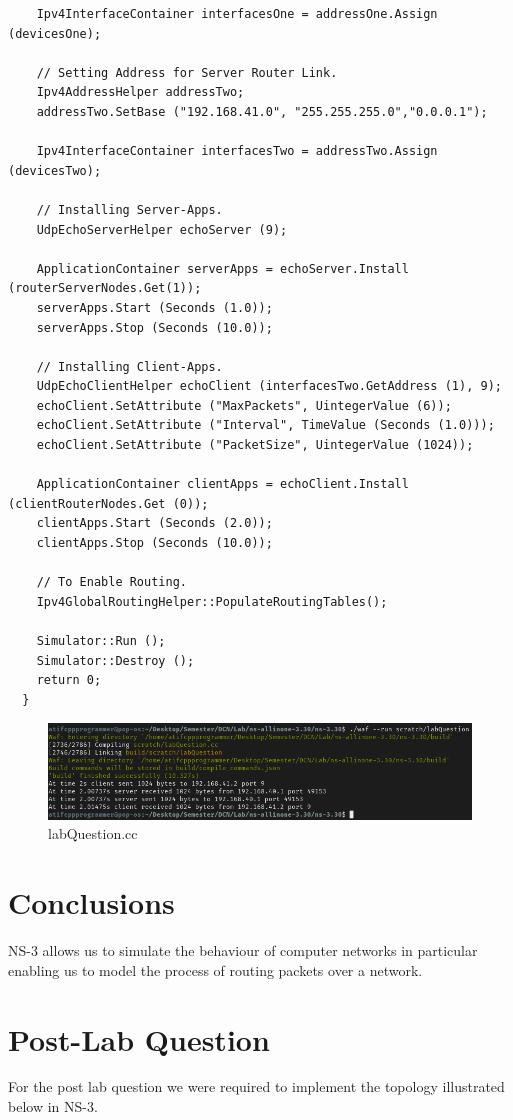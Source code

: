 \documentclass[fullpage]{article}
\begin{document}
\begin{verbatim}
    Ipv4InterfaceContainer interfacesOne = addressOne.Assign (devicesOne);

    // Setting Address for Server Router Link.
    Ipv4AddressHelper addressTwo;
    addressTwo.SetBase ("192.168.41.0", "255.255.255.0","0.0.0.1");

    Ipv4InterfaceContainer interfacesTwo = addressTwo.Assign (devicesTwo);

    // Installing Server-Apps.
    UdpEchoServerHelper echoServer (9);

    ApplicationContainer serverApps = echoServer.Install (routerServerNodes.Get(1));
    serverApps.Start (Seconds (1.0));
    serverApps.Stop (Seconds (10.0));

    // Installing Client-Apps.
    UdpEchoClientHelper echoClient (interfacesTwo.GetAddress (1), 9);
    echoClient.SetAttribute ("MaxPackets", UintegerValue (6));
    echoClient.SetAttribute ("Interval", TimeValue (Seconds (1.0)));
    echoClient.SetAttribute ("PacketSize", UintegerValue (1024));

    ApplicationContainer clientApps = echoClient.Install (clientRouterNodes.Get (0));
    clientApps.Start (Seconds (2.0));
    clientApps.Stop (Seconds (10.0));

    // To Enable Routing.
    Ipv4GlobalRoutingHelper::PopulateRoutingTables();

    Simulator::Run ();
    Simulator::Destroy ();
    return 0;
  }
\end{verbatim}

\begin{figure}[H]
  \includegraphics[width=\linewidth]{labQuestion.png}
  \caption{labQuestion.cc}
  \label{fig:output2}
\end{figure}

\section{Conclusions}
NS-3 allows us to simulate the behaviour of computer networks in particular
enabling us to model the process of routing packets over a network.

\section{Post-Lab Question}
For the post lab question we were required to implement the topology illustrated below
in NS-3.
\end{document}

